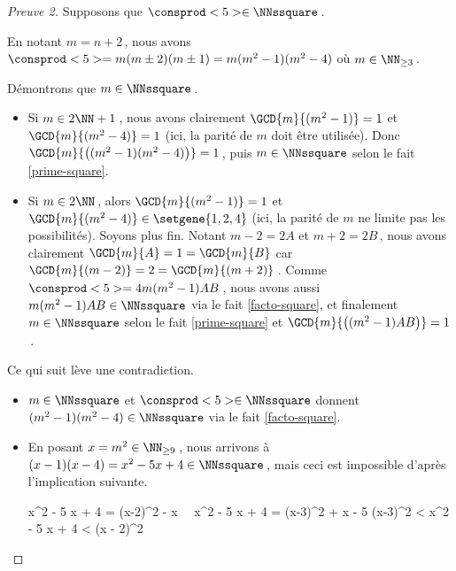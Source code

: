 \begin{proof}[Preuve 2]
	Supposons que $\consprod<5> \in \NNssquare$\,.
    
    \smallskip
    
	En notant $m = n+2$\,, nous avons $\consprod<5> = m (m \pm 2) (m \pm 1) = m (m^2 - 1) (m^2 - 4)$ où $m \in \NN_{\geq 3}$\,.
    
    \medskip
    
    Démontrons que $m \in \NNssquare$\,.
	\begin{itemize}
		\item Si $m \in 2 \NN + 1$\,, nous avons clairement $\GCD{m}{(m^2 - 1)} = 1$ et $\GCD{m}{(m^2 - 4)} = 1$ (ici, la parité de $m$ doit être utilisée).
		Donc $\GCD{m}{\big( (m^2 - 1) (m^2 - 4) \big)} = 1$\,, puis $m \in \NNssquare$ selon le fait \ref{prime-square}.

		\item Si $m \in 2 \NN$\,, alors $\GCD{m}{(m^2 - 1)} = 1$ et $\GCD{m}{(m^2 - 4)} \in \setgene{1, 2, 4}$ (ici, la parité de $m$ ne limite pas les possibilités). Soyons plus fin.
		Notant $m - 2 = 2A$ et $m + 2 = 2B$\,, nous avons clairement $\GCD{m}{A} = 1 = \GCD{m}{B}$ car $\GCD{m}{(m - 2)} = 2 = \GCD{m}{(m + 2)}$\,.
		Comme $\consprod<5> = 4 m (m^2 - 1) A B$\,, nous avons aussi $m (m^2 - 1) A B \in \NNssquare$ via le fait \ref{facto-square}, et finalement $m \in \NNssquare$ selon le fait \ref{prime-square} et $\GCD{m}{\big( (m^2 - 1) A B \big)} = 1$\,. 
	\end{itemize}
    
    \medskip
    
    Ce qui suit lève une contradiction.
	\begin{itemize}
		\item $m \in \NNssquare$ et $\consprod<5> \in \NNssquare$ donnent $(m^2 - 1) (m^2 - 4) \in \NNssquare$ via le fait \ref{facto-square}. 

		\item En posant $x = m^2 \in \NN_{\geq 9}$\,, nous arrivons à $(x - 1) (x - 4) = x^2 - 5 x + 4 \in \NNssquare$\,, mais ceci est impossible d'après l'implication suivante.
		
		\noindent\kern-10pt%
		\begin{stepcalc}[style=ar*, ope={\implies}]
			x^2 - 5 x + 4 = (x-2)^2 - x
			\,\,\,\,
			x^2 - 5 x + 4 = (x-3)^2 + x - 5
			(x-3)^2 < x^2 - 5 x + 4 < (x - 2)^2
		\end{stepcalc}
	\end{itemize}

    \vspace{-1.5ex}
    \qedhere
\end{proof}



